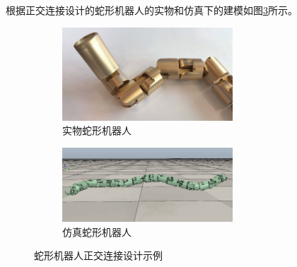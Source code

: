 根据正交连接设计的蛇形机器人的实物和仿真下的建模如图\ref{fig:snakeexample}所示。
\begin{figure}[h!] %
	\begin{subfigure}{0.5\textwidth}
		\centering
		\includegraphics[width=0.7\textwidth,height=0.15\textheight]{figure/chap03/realSnake.eps}
		\caption{实物蛇形机器人}
		\label{fig:realSnake}
	\end{subfigure}
	\begin{subfigure}{0.5\textwidth}
		\centering
		\includegraphics[width=0.7\textwidth,height=0.15\textheight]{figure/chap03/simulateSnake.eps}
		\caption{仿真蛇形机器人}
		\label{fig:simulateSnake}
	\end{subfigure}
	\caption{蛇形机器人正交连接设计示例}
	\label{fig:snakeexample}
\end{figure}

